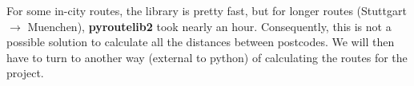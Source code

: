 \noindent For some in-city routes, the library is pretty fast, but for longer routes (Stuttgart $\rightarrow$ Muenchen), \textbf{pyroutelib2} took nearly an hour. Consequently, this is not a possible solution to calculate all the distances between postcodes. We will then have to turn to another way (external to python) of calculating the routes for the project.
